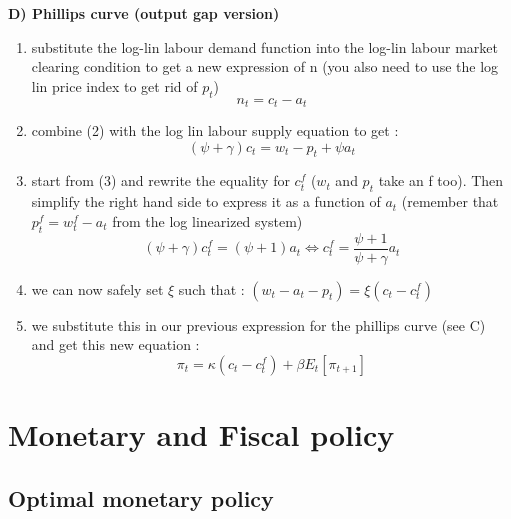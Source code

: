 \documentclass{article}
\begin{document}
\textbf{D) Phillips curve (output gap version)}
\begin{enumerate}
    \item substitute the log-lin labour demand function into the log-lin labour market clearing condition to get a new expression of n (you also need to use the log lin price index to get rid of $p_t$)
    \begin{equation}
        n_t=c_t-a_t
    \end{equation}
    \item combine (2) with the log lin labour supply equation to get : 
    \begin{equation}
        (\psi + \gamma)c_t=w_t-p_t+\psi a_t
    \end{equation}
    \item start from (3) and rewrite the equality for $c_t^f$ ($w_t$ and $p_t$ take an f too). Then simplify the right hand side to express it as a function of $a_t$ (remember that $p_t^f = w_t^f-a_t$ from the log linearized system)
    \begin{equation}
        (\psi+\gamma)c_t^f = (\psi + 1)a_t \Longleftrightarrow c_t^f = \frac{\psi+1}{\psi + \gamma}a_t
    \end{equation}
    \item we can now safely set $\xi$ such that : $(w_t-a_t-p_t) = \xi (c_t-c_t^f)$
    \item we substitute this in our previous expression for the phillips curve (see C) and get this new equation : 
    \begin{equation}
        \pi_t = \kappa(c_t-c_t^f)+\beta E_t[\pi_{t+1}]
    \end{equation}
\end{enumerate}



\section{Monetary and Fiscal policy}
\subsection{Optimal monetary policy}
\end{document}
